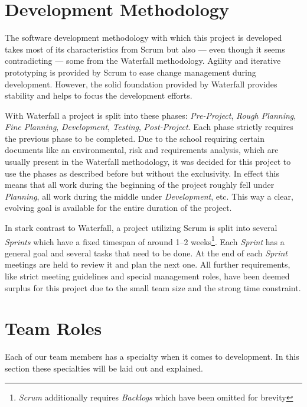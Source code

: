 \section{Development Methodology}
\def \kapitelautor {Clemens Stadlbauer}

The software development methodology with which this project is developed takes
most of its characteristics from Scrum but also --- even though it seems
contradicting --- some from the Waterfall methodology. Agility and iterative
prototyping is provided by Scrum to ease change management during development.
However, the solid foundation provided by Waterfall provides stability and
helps to focus the development efforts.

With Waterfall a project is split into these phases: \emph{Pre-Project},
\emph{Rough Planning}, \emph{Fine Planning}, \emph{Development},
\emph{Testing}, \emph{Post-Project}. Each phase strictly requires the previous
phase to be completed.
Due to the school requiring certain documents like an environmental, risk and
requirements analysis, which are usually present in the Waterfall methodology,
it was decided for this project to use the phases as described before but
without the exclusivity. In effect this means that all work during the
beginning of the project roughly fell under \emph{Planning}, all work during
the middle under \emph{Development}, etc. This way a clear, evolving goal is
available for the entire duration of the project.

In stark contrast to Waterfall, a project utilizing Scrum is split into several
\emph{Sprints} which have a fixed timespan of around 1--2
weeks\footnote{\emph{Scrum} additionally requires \emph{Backlogs} which have
been omitted for brevity}. Each \emph{Sprint} has a general goal and several
tasks that need to be done. At the end of each \emph{Sprint} meetings are held
to review it and plan the next one.
All further requirements, like strict meeting guidelines and special management
roles, have been deemed surplus for this project due to the small team size and
the strong time constraint.

\section{Team Roles}
\def \kapitelautor {Clemens Stadlbauer}


Each of our team members has a specialty when it comes to development. In this
section these specialties will be laid out and explained. %

